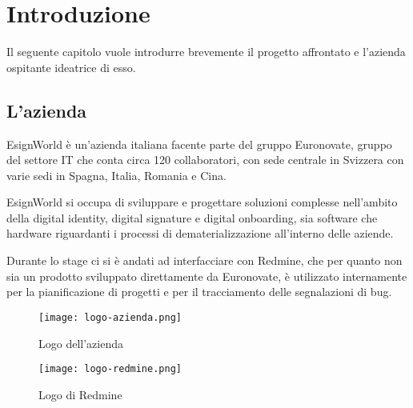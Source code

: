 
\chapter{Introduzione}
\label{cap:introduzione}

Il seguente capitolo vuole introdurre brevemente il progetto affrontato e l'azienda ospitante ideatrice di esso. \\



\iffalse
\noindent Esempio di utilizzo di un termine nel glossario \\
\gls{api}. \\
\noindent Esempio di citazione in linea \\
\cite{site:agile-manifesto}. \\
\noindent Esempio di citazione nel pie' di pagina \\
citazione\footcite{womak:lean-thinking} \\
\fi


\section{L'azienda}

\par EsignWorld è un'azienda italiana facente parte del gruppo Euronovate, gruppo del settore IT che conta circa 120 collaboratori, con sede centrale in Svizzera con varie sedi in Spagna, Italia, Romania e Cina. 
\newline
\newline
\par EsignWorld si occupa di sviluppare e progettare soluzioni complesse nell'ambito della digital identity, digital signature e digital onboarding, sia software che hardware riguardanti i processi di dematerializzazione all'interno delle aziende.
\newline
\newline
\par Durante lo stage ci si è andati ad interfacciare con Redmine, che per quanto non sia un prodotto sviluppato direttamente da Euronovate, è utilizzato internamente per la pianificazione di progetti e per il tracciamento delle segnalazioni di bug.
\newline
\begin{figure}[!h] 
	\centering 
	\texttt{[image: logo-azienda.png]} 
	\caption{Logo dell'azienda}
\end{figure}
\begin{figure}[!h] 
	\centering 
	\texttt{[image: logo-redmine.png]} 
	\caption{Logo di Redmine}
\end{figure}
\newpage
